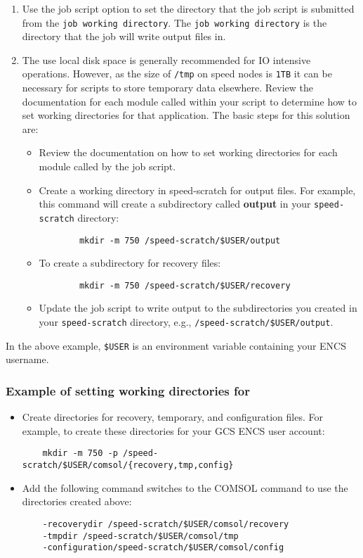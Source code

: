 \begin{enumerate}
	\item
Use the  job script option to set the directory that the job 
script is submitted from the \texttt{job working directory}. The
\texttt{job working directory} is the directory that the job will write output files in.
 	\item
The use local disk space is generally recommended for IO intensive operations.
However, as the size of \texttt{/tmp} on speed nodes 
is \texttt{1TB} it can be necessary for scripts to store temporary data 
elsewhere.
Review the documentation for each module called within your script to 
determine how to set working directories for that application. 
The basic steps for this solution are:
\begin{itemize}
	\item
	Review the documentation on how to set working directories for 
	each module called by the job script.
	\item
	Create a working directory in speed-scratch for output files. 
	For example, this command will create a subdirectory called \textbf{output}
	in your \verb!speed-scratch! directory:
	 \begin{verbatim}
		mkdir -m 750 /speed-scratch/$USER/output
	 \end{verbatim}
	\item
	To create a subdirectory for recovery files:
	\begin{verbatim}
		mkdir -m 750 /speed-scratch/$USER/recovery
	\end{verbatim}
	\item
	Update the job script to write output to the subdirectories you created in
	your \verb!speed-scratch! directory, e.g., \verb!/speed-scratch/$USER/output!.
	\end{itemize}
\end{enumerate}
In the above example, \verb!$USER! is an environment variable containing your ENCS username.

\subsubsection{Example of setting working directories for }

\begin{itemize}
	\item 
	Create directories for recovery, temporary, and configuration files. 
	For example, to create these directories for your GCS ENCS user account:
	\begin{verbatim}
	mkdir -m 750 -p /speed-scratch/$USER/comsol/{recovery,tmp,config}
	\end{verbatim}
	\item
	Add the following command switches to the COMSOL command to use the 
	directories created above:
	\begin{verbatim} 
	-recoverydir /speed-scratch/$USER/comsol/recovery 
	-tmpdir /speed-scratch/$USER/comsol/tmp
	-configuration/speed-scratch/$USER/comsol/config
	\end{verbatim}
\end{itemize} 

